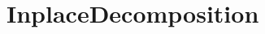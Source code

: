 \hypertarget{group___inplace_decomposition}{}\section{Inplace\+Decomposition}
\label{group___inplace_decomposition}
